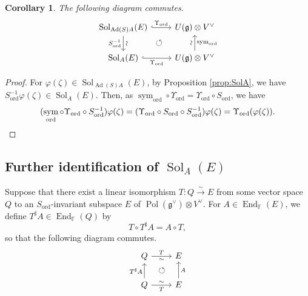 \documentclass[a4paper,11pt,reqno]{amsart}
\newcommand{\frakg}{\mathfrak{g}}
\newcommand{\0}{{\bf 0}}
\newcommand{\F}{\mathbb{F}}
\newcommand{\1}{{\bf 1}}
\DeclareMathOperator{\Ad}{Ad}
\DeclareMathOperator{\End}{End}
\DeclareMathOperator{\Pol}{Pol}
\newcommand{\ord}{{\mathrm{ord}}}
\DeclareMathOperator{\Sol}{Sol}
\DeclareMathOperator{\sym}{sym}
\theoremstyle{plain}
\newtheorem{corollary}[equation]{Corollary}
\theoremstyle{definition}
\numberwithin{equation}{section}
\theoremstyle{definition}
\begin{document}
\begin{corollary}\label{cor:SolAU}
The following diagram commutes.
\begin{equation}\label{eqn:RS2}
\begin{tikzcd}
	{\Sol_{\Ad(S)A}(E)}& {U(\frakg)\otimes V^\vee}
	\arrow[dl, pos=0.5, phantom, "\circlearrowleft"] \\
	{\Sol_A(E)} & {U(\frakg)\otimes V^\vee}
	\arrow["{\Upsilon_{\ord}}", hook, from=1-1, to=1-2]
	\arrow["\sim" sloped, "{S_{\ord}^{-1}}"',   from=1-1, to=2-1]
	\arrow["\sim" sloped, "\sym_{\ord}"',  from=2-2, to=1-2]
	\arrow["{\Upsilon_{\ord}}"', hook, from=2-1, to=2-2]
\end{tikzcd}
\end{equation}
\end{corollary}

\begin{proof}
For $\varphi(\zeta) \in  \Sol_{\Ad(S)A}(E)$,
by Proposition \ref{prop:SolA}, we have $S_\ord^{-1}\varphi(\zeta) \in \Sol_{A}(E)$.
Then, as $\sym_{\ord} \circ \Upsilon_{\ord} 
= \Upsilon_{\ord} \circ S_\ord$, we have 
\begin{equation*}
(\sym_{\ord} \circ \Upsilon_{\ord} \circ S_\ord^{-1})\varphi(\zeta)
=(\Upsilon_{\ord} \circ S_\ord \circ S_\ord^{-1})\varphi(\zeta)
=\Upsilon_{\ord}(\varphi(\zeta)).\qedhere
\end{equation*}
\end{proof}


\subsection{Further identification of \texorpdfstring{$\Sol_A(E)$}{Sol_A(E)}}
\label{sec:ImFc}

Suppose that there exist a linear isomorphism 
$T\colon Q \stackrel{\sim}{\to} E$ from 
some vector space $Q$ to 
an $S_\ord$-invariant
subspace $E$ of $\Pol(\frakg^\vee)\otimes V^\vee$. 
For $A\in \End_\F(E)$, we define 
$T^\sharp A\in \End_\F(Q)$ by
\begin{equation*}
T\circ T^\sharp A=A\circ T, 
\end{equation*}
so that the following diagram commutes.
\[\begin{tikzcd}
	{Q} & {E} 	\arrow[dl, pos=0.5, phantom, "\circlearrowleft"] \\
	{Q} & {E}
	\arrow["{T}", "\sim"', from=1-1, to=1-2]
	\arrow["{T^\sharp A}", from=2-1, to=1-1]
	\arrow["A"', from=2-2, to=1-2]
	\arrow["\sim", "{T}"', from=2-1, to=2-2]
\end{tikzcd}\]
\end{document}
